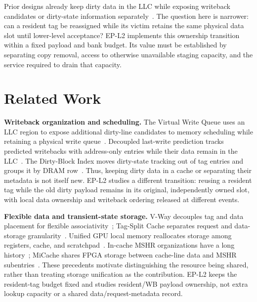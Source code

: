 
Prior designs already keep dirty data in the LLC while exposing writeback
candidates or dirty-state information separately~\cite{vwq,lastwrite,dbi}.
The question here is narrower: can a resident tag be reassigned while its
victim retains the same physical data slot until lower-level acceptance?
EP-L2 implements this ownership transition within a fixed payload and bank
budget. Its value must be established by separating copy removal, access to
otherwise unavailable staging capacity, and the service required to drain
that capacity.

\section{Related Work}
\textbf{Writeback organization and scheduling.}
The Virtual Write Queue uses an LLC region to expose additional dirty-line
candidates to memory scheduling while retaining a physical write queue~\cite{vwq}.
Decoupled last-write prediction tracks predicted writebacks with address-only
entries while their data remain in the LLC~\cite{lastwrite}.
The Dirty-Block Index moves dirty-state tracking out of tag entries and groups
it by DRAM row~\cite{dbi}.
Thus, keeping dirty data in a cache or separating their metadata is not itself
new. EP-L2 studies a different transition: reusing a resident tag while the
old dirty payload remains in its original, independently owned slot, with
local data ownership and writeback ordering released at different events.

\textbf{Flexible data and transient-state storage.}
V-Way decouples tag and data placement for flexible associativity~\cite{vway};
Tag-Split Cache separates request and data-storage granularity~\cite{tsc}.
Unified GPU local memory reallocates storage among registers, cache, and
scratchpad~\cite{unified}.
In-cache MSHR organizations have a long history~\cite{farkas}; MiCache shares
FPGA storage between cache-line data and MSHR subentries~\cite{micache}.
These precedents motivate distinguishing the resource being shared, rather
than treating storage unification as the contribution. EP-L2 keeps the
resident-tag budget fixed and studies resident/WB payload ownership, not
extra lookup capacity or a shared data/request-metadata record.

